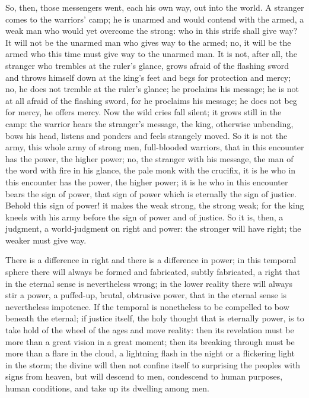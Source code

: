 \documentclass[12pt,a4paper,openany]{book}
\newcommand{\opage}[1]{\marginnote{\footnotesize\textit{[#1]}}}
\begin{document}
So, then, those messengers went, each his own way, out
into the world. A stranger comes to the warriors' camp;
he is unarmed and would contend with the armed, a
weak man who would yet overcome the strong: who in this
strife shall give way? It will not be the unarmed man who gives way
to the armed; no, it will be the armed who
this time must give way to the unarmed man. It is not, after all,
the stranger who trembles at the ruler's glance, grows
afraid of the flashing sword and throws himself down at the king's
feet and begs for protection and mercy; no, he does not tremble
at the ruler's glance; he proclaims his message; he is
not at all afraid of the flashing sword, for he proclaims his
message; he does not beg for mercy, he offers mercy.
Now the wild cries fall silent; it grows still in the camp:
the warrior hears the stranger's message, the king, otherwise
unbending, bows his head, listens and ponders and feels
strangely moved. So it is not the army, this whole
army of strong men, full-blooded warriors, that in this encounter
has the power, the higher power; no, the stranger with his
message, the man of the word with fire in his glance, the pale monk
with the crucifix, it is he who in this encounter has the power,
the higher power; it is he who in this encounter bears
the sign of power, that sign of power which is eternally the sign
of justice. Behold this sign of power! it makes the weak
strong, the strong weak; for the king kneels with his army before
\opage{6}the sign of power and of justice. So it is, then, a
judgment, a world-judgment on right and power: the stronger will
have right; the weaker must give way.

There is a difference in right and there is a difference in power;
in this temporal sphere there will always be formed and fabricated, subtly
fabricated, a right that in the eternal sense is nevertheless wrong; in
the lower reality there will always stir a power, a puffed-up, brutal,
obtrusive power, that in the eternal sense is nevertheless impotence.
If the temporal is nonetheless to be compelled to bow
beneath the eternal; if justice itself, the holy thought
that is eternally power, is to take hold of the wheel of the ages and move
reality: then its revelation must be more than a
great vision in a great moment; then its breaking through must
be more than a flare in the cloud, a lightning flash in the night or a
flickering light in the storm; the divine will then not
confine itself to surprising the peoples with signs from heaven,
but will descend to men, condescend to human
purposes, human conditions, and take up its dwelling among
men.
\end{document}
